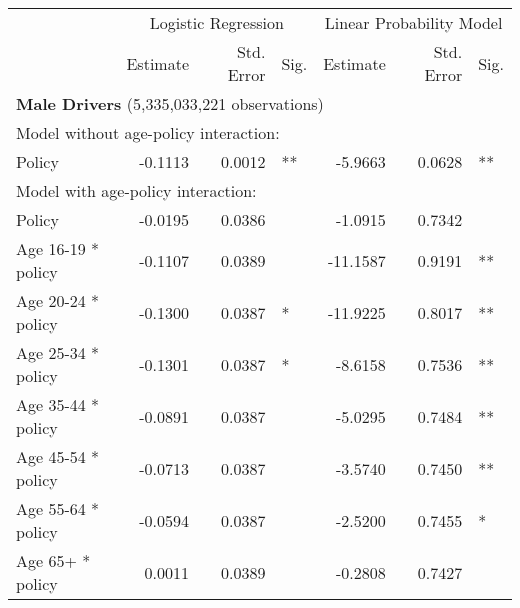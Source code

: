 
\begin{table}%
\centering 
\begin{tabular}{l r r l r r l} 

\hline 
 
 & \multicolumn{3}{c}{Logistic Regression}  & \multicolumn{3}{c}{Linear Probability Model} \\ 

 \cmidrule(lr){2-4}\cmidrule(lr){5-7} 
 & Estimate & Std. Error & Sig. & Estimate & Std. Error & Sig. \\ 

\hline 
 
\multicolumn{7}{l}{\textbf{Male Drivers} (5,335,033,221 observations)} \\ 

\hline
\multicolumn{7}{l}{Model without age-policy interaction: } \\ 
Policy                   &  -0.1113        &  0.0012       &   **       &  -5.9663        &  0.0628       &   **       \\ 
\hline
\multicolumn{7}{l}{Model with age-policy interaction: } \\ 
Policy                   &  -0.0195        &  0.0386       &            &  -1.0915        &  0.7342       &            \\ 
Age 16-19 * policy   &  -0.1107        &  0.0389       &            &  -11.1587        &  0.9191       &   **       \\ 
Age 20-24 * policy   &  -0.1300        &  0.0387       &    *       &  -11.9225        &  0.8017       &   **       \\ 
Age 25-34 * policy   &  -0.1301        &  0.0387       &    *       &  -8.6158        &  0.7536       &   **       \\ 
Age 35-44 * policy   &  -0.0891        &  0.0387       &            &  -5.0295        &  0.7484       &   **       \\ 
Age 45-54 * policy   &  -0.0713        &  0.0387       &            &  -3.5740        &  0.7450       &   **       \\ 
Age 55-64 * policy   &  -0.0594        &  0.0387       &            &  -2.5200        &  0.7455       &    *       \\ 
Age 65+ * policy   &  0.0011        &  0.0389       &            &  -0.2808        &  0.7427       &            \\ 


\end{tabular}
\end{table}
